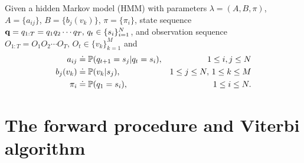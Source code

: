 Given a hidden Markov model (HMM) with parameters $\lambda = (A, B, \pi)$,
$A = \{a_{ij}\}$, $B = \{b_j(v_k)\}$, $\pi = \{\pi_i\}$, 
state sequence $\mathbf{q} = q_{1:T} = q_1 q_2 \cdots q_T, \, q_t \in \{s_i\}_{i=1}^N$,
and observation sequence $O_{1:T} = O_1 O_2 \cdots O_T, \, O_t \in \{v_k\}_{k=1}^M$ and
\begin{equation}
\label{eq:notebasic}
\begin{aligned}
a_{ij}   & \doteq \mathbb{P}(q_{t+1} = s_j |q_{t} = s_i), & 1 \le i,j \le N \\
b_j(v_k) & \doteq \mathbb{P}(v_k |s_j),                   & 1 \le j \le N, \, 1 \le k \le M   \\
\pi_i    & \doteq \mathbb{P}(q_1 = s_i),                  & 1 \le i \le N.
\end{aligned}
\end{equation}



\section{The forward procedure and Viterbi algorithm}
\label{sec:forward}

